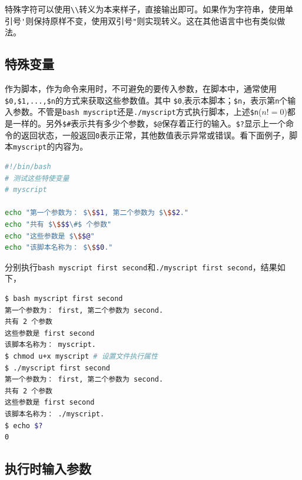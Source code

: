 \documentclass[doctor,openright,twoside]{sjtuthesis}
\newcommand{\passthrough}[1]{#1}
\theoremstyle{plain}
\theoremstyle{definition}
\theoremstyle{remark}
\theoremstyle{ocrenumbox}
\theoremstyle{plain}
\begin{document}
特殊字符可以使用\passthrough{\lstinline!\\!}转义为本来样子，直接输出即可。如果作为字符串，使用单引号\passthrough{\lstinline!'!}则保持原样不变，使用双引号\passthrough{\lstinline!"!}则实现转义。这在其他语言中也有类似做法。

\subsection{特殊变量}

作为脚本，作为命令来用时，不可避免的要传入参数，在脚本中，通常使用\passthrough{\lstinline!$0,$1,...,$n!}的方式来获取这些参数值。其中
\passthrough{\lstinline!$0!},表示本脚本；\passthrough{\lstinline!$n!}，表示第\passthrough{\lstinline!n!}个输入参数。不管是\passthrough{\lstinline!bash myscript!}还是\passthrough{\lstinline!./myscript!}方式执行脚本，上述\passthrough{\lstinline!$n!}(\(n!=0\))都是一样的。另外\passthrough{\lstinline!$#!}表示共有多少个参数，\passthrough{\lstinline!$@!}保存着正行的输入。\passthrough{\lstinline!$?!}显示上一个命令的返回状态，一般返回\passthrough{\lstinline!0!}表示正常，其他数值表示异常或错误。看下面例子，脚本\passthrough{\lstinline!myscript!}的内容为。
\lstset{mathescape=true}

\begin{lstlisting}[language=bash]
#!/bin/bash
# 测试这些特使变量
# myscript

echo "第一个参数为： $\$$1, 第二个参数为 $\$$2."
echo "共有 $\$$$\#$ 个参数"
echo "这些参数是 $\$$@"
echo "该脚本名称为： $\$$0."
\end{lstlisting}

\lstset{mathescape=false}

分别执行\passthrough{\lstinline!bash myscript first second!}和\passthrough{\lstinline!./myscript first second!}，结果如下，

\begin{lstlisting}[language=bash]
$ bash myscript first second
第一个参数为： first, 第二个参数为 second.
共有 2 个参数
这些参数是 first second
该脚本名称为： myscript.
$ chmod u+x myscript # 设置文件执行属性
$ ./myscript first second
第一个参数为： first, 第二个参数为 second.
共有 2 个参数
这些参数是 first second
该脚本名称为： ./myscript.
$ echo $?
0
\end{lstlisting}

\subsection{执行时输入参数}
\end{document}
